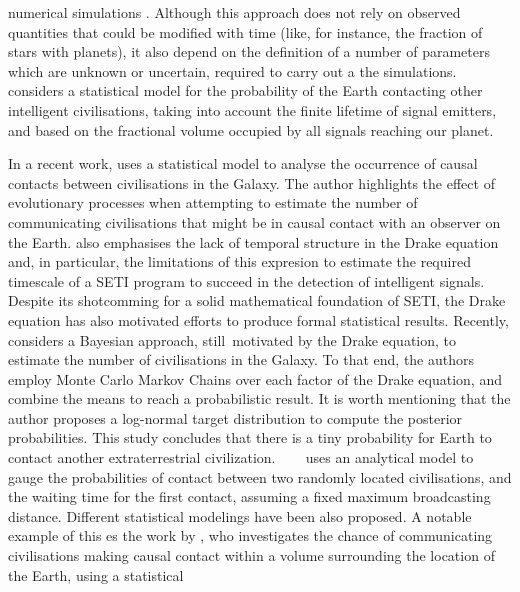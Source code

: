\documentclass[crop]{CSLB}
\begin{document}
numerical simulations \citep{forgan_evaluating_2015,
vukotic_grandeur_2016, murante_simulating_2015, forgan_numerical_2009,
forgan_galactic_2017, ramirez_new_2017}.
%
Although this approach does not rely on observed quantities that could
be modified with time (like, for instance, the fraction of stars with planets), 
it also depend on the definition of a number of
parameters which are unknown or uncertain, required to carry out
a the simulations.
%
\citet{grimaldi_signal_2017} considers a statistical model for the
probability of the Earth contacting other intelligent civilisations,
taking into account the finite lifetime of signal emitters, and based
on the fractional volume occupied by all signals reaching our planet.



In a recent work, \citet{balbi_impact_2018} uses a statistical model to
analyse the occurrence of causal contacts between civilisations in the
Galaxy.
%
The author highlights the effect of evolutionary processes when
attempting to estimate the number of communicating civilisations that
might be in causal contact with an observer on the Earth.
%
\citet{cirkovic_temporal_2004} also emphasises the lack of temporal
structure in the Drake equation and, in particular, the limitations
of this expresion to estimate the required timescale of a SETI
program to succeed in the detection of intelligent signals.
%
Despite its shotcomming for a solid mathematical foundation of SETI, 
the Drake equation has also motivated efforts to produce formal
statistical results.
%
Recently, \citet{bloetscher_using_2019} considers a Bayesian approach,
still motivated by the Drake equation, to estimate
the number of civilisations in the Galaxy.
%
To that end, the authors employ Monte Carlo Markov Chains over each factor
of the Drake equation, and combine the means to reach a probabilistic
result.
%
It is worth mentioning that the author proposes a log-normal target
distribution to compute the posterior probabilities.
%
This study concludes that there is a tiny probability for Earth to
contact another extraterrestrial civilization.    
%
\citet{smith_broadcasting_2009} uses an analytical model to gauge the
probabilities of contact between two randomly located civilisations,
and the waiting time for the first contact, assuming a fixed maximum
broadcasting distance.
% 
Different statistical modelings have been also proposed.
%
A notable example of this es the work by \citet{balbi_impact_2018}, who investigates the
chance of communicating civilisations making causal contact within a
volume surrounding the location of the Earth, using a statistical
\end{document}
